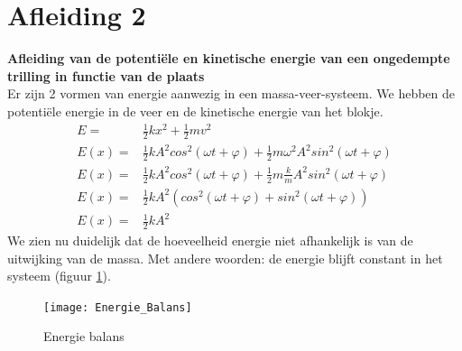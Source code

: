 \documentclass[a4paper,kul]{kulakarticle} %
\begin{document}
\newpage
\section{Afleiding 2}
\textbf{Afleiding van de potentiële en kinetische energie van een ongedempte trilling in functie van de plaats}
\\

Er zijn 2 vormen van energie aanwezig in een massa-veer-systeem. We hebben de potentiële energie in de veer en de kinetische energie van het blokje.
\begin{align*}
	E = & \frac{1}{2}kx^2 + \frac{1}{2}mv^2\\
	E(x) = & \frac{1}{2}k A^2cos^2(\omega t +\varphi) + \frac{1}{2}m \omega^2 A^2 sin^2(\omega t + \varphi)\\
	E(x) = & \frac{1}{2}k A^2cos^2(\omega t +\varphi) + \frac{1}{2}m \frac{k}{m} A^2 sin^2(\omega t + \varphi)\\
	E(x) = & \frac{1}{2} k A^2 (cos^2(\omega t +\varphi) + sin^2(\omega t + \varphi))\\
	E(x) = & \frac{1}{2} k A^2
\end{align*} 
We zien nu duidelijk dat de hoeveelheid energie niet afhankelijk is van de uitwijking van de massa. Met andere woorden: de energie blijft constant in het systeem (figuur \ref{fig:energiebalans}).
\begin{figure}[htbp]
	\centering
	\texttt{[image: Energie\_Balans]}
	\caption[Energie balans]{Energie balans}
	\label{fig:energiebalans}
\end{figure}

\newpage
\end{document}
